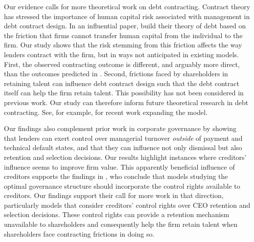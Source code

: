 \documentclass[a4paper,12pt]{article}
\begin{document}
Our evidence calls for more theoretical work on debt contracting.
Contract theory has stressed the importance of human capital risk associated with management in debt contract design.
In an influential paper, \citet{Hart_1994} build their theory of debt based on the friction that firms cannot transfer human capital from the individual to the firm.
Our study shows that the risk stemming from this friction affects the way lenders contract with the firm, but in ways not anticipated in existing models.
First, the observed contracting outcome is different, and arguably more direct, than the outcomes predicted in \citet{Hart_1994}.
Second, frictions faced by shareholders in retaining talent can influence debt contract design such that the debt contract itself can help the firm retain talent.
This possibility has not been considered in previous work.
Our study can therefore inform future theoretical research in debt contracting.
See, for example, \citet{bolton_2019} for recent work expanding the \citet{Hart_1994} model.

Our findings also complement prior work in corporate governance by showing that lenders can exert control over managerial turnover \textit{outside} of payment and technical default states, and that they can influence not only dismissal but also retention and selection decisions.
Our results highlight instances where creditors' influence seems to improve firm value.
This apparently beneficial influence of creditors supports the findings in \citet{Nini_2012}, who conclude that models studying the optimal governance structure should incorporate the control rights available to creditors.
Our findings support their call for more work in that direction, particularly models that consider creditors' control rights over CEO retention and selection decisions.
These control rights can provide a retention mechanism unavailable to shareholders and consequently help the firm retain talent when shareholders face contracting frictions in doing so.
\end{document}
